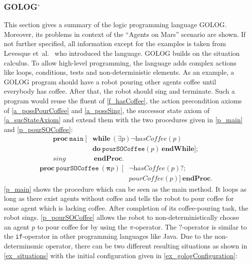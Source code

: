 \subsubsection[GOLOG]{GOLOG$^\circ$}\label{fun:apl_golog}
This section gives a summary of the logic programming language GOLOG.
Moreover, its problems in context of the \enquote{Agents on Mars} scenario are shown.
If not further specified, all information except for the examples is taken from Levesque et~al.~\cite{levesque_golog:_1997} who introduced the language.
GOLOG builds on the situation calculus.
To allow high-level programming, the language adds complex actions like loops, conditions, tests and non-deterministic elements.
As an example, a GOLOG program should have a robot pouring other agents coffee until everybody has coffee.
After that, the robot should sing and terminate.
Such a program would reuse the fluent of \autoref{f_hasCoffee}, the action precondition axioms of \autoref{a_possPourCoffee} and \ref{a_possSing}, the successor state axiom of \autoref{a_sucStateAxiom} and extend them with the two procedures given in \autoref{p_main} and \ref{p_pourSOCoffee}:
\begin{equation}\label{p_main}
  \begin{split}
    \textbf{proc}\ \texttt{main}\ [&\textbf{while}\ (\exists p) \neg\textit{hasCoffee}(p) \\
    &\textbf{do}\ \texttt{pourSOCoffee}(p)\ \textbf{endWhile}]; \\
    \textit{sing}&\ \textbf{endProc}.
  \end{split}
\end{equation}
\begin{equation}\label{p_pourSOCoffee}
  \begin{split}
    \textbf{proc}\ \texttt{pourSOCoffee}\ (\boldsymbol{\pi} p)\ [ &\neg\textit{hasCoffee}(p)\textbf{?}; \\
    &\textit{pourCoffee}(p)]\ \textbf{endProc}.
  \end{split}
\end{equation}
\autoref{p_main} shows the procedure which can be seen as the main method.
It loops as long as there exist agents without coffee and tells the robot to pour coffee for some agent which is lacking coffee.
After completion of its coffee-pouring task, the robot sings.
\autoref{p_pourSOCoffee} allows the robot to non-deterministically choose an agent $p$ to pour coffee for by using the $\pi$-operator.
The $?$-operator is similar to the \texttt{if}-operator in other programming languages like Java.
Due to the non-determinsmic operator, there can be two different resulting situations as shown in \autoref{ex_situations} with the initial configuration given in \autoref{ex_gologConfiguration}:
